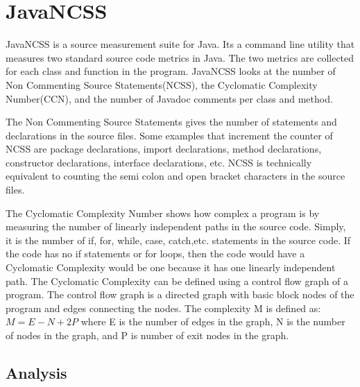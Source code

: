\documentclass[12pt]{article}
\begin{document}
\vspace*{.1in}
\section{JavaNCSS}
\label{sec:JavaNCSS}
\vspace*{-.1in}

JavaNCSS is a source measurement suite for Java. Its a command line utility that measures two standard source code metrics in Java. The two metrics are collected for each class and function in the program. JavaNCSS looks at the number of Non Commenting Source Statements(NCSS), the Cyclomatic Complexity Number(CCN), and the number of Javadoc comments per class and method. 

The Non Commenting Source Statements gives the number of statements and declarations in the source files. Some examples that increment the counter of NCSS are package declarations, import declarations, method declarations, constructor declarations, interface declarations, etc. NCSS is technically equivalent to counting the semi colon and open bracket characters in the source files. 

The Cyclomatic Complexity Number shows how complex a program is by measuring the number of linearly independent paths in the source code. Simply, it is the number of if, for, while, case, catch,etc. statements in the source code. If the code has no if statements or for loops, then the code would have a Cyclomatic Complexity would be one because it has one linearly independent path. The Cyclomatic Complexity can be defined using a control flow graph of a program. The control flow graph is a directed graph with basic block nodes of the program and edges connecting the nodes. The complexity M is defined as: $M = E-N+2P$ where E is the number of edges in the graph, N is the number of nodes in the graph, and P is number of exit nodes in the graph. 


\subsection{Analysis}
\end{document}
